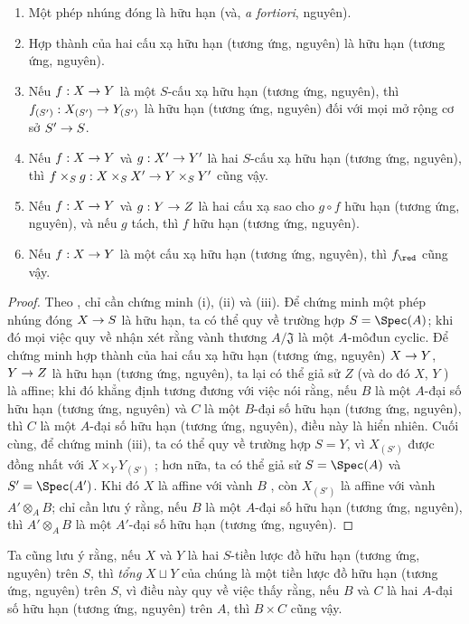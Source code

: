 \documentclass[oneside,10pt]{amsart}
\makeatletter
\newcommand{\ega@arrow}[2]{\mathchoice{#1}{#2}{#2}{#2}}
\renewcommand{\to}{\ega@arrow{\longrightarrow}{\rightarrow}}
\newcommand{\oldpage}[2][]{\marginnote{\normalfont\footnotesize\textbf{#1}~|~#2}\ignorespaces}
\let\EGAOriginalLabel\label
\renewcommand{\label}[1]{\phantomsection\EGAOriginalLabel{#1}}
\makeatother
\begin{document}
\begin{proposition}[6.1.5]
\label{II.6.1.5}
\medskip\noindent
\begin{enumerate}
  \item[\rm{(i)}] Một phép nhúng đóng là hữu hạn (và, \emph{a fortiori}, nguyên).
  \item[\rm{(ii)}] Hợp thành của hai cấu xạ hữu hạn (tương ứng, nguyên) là hữu hạn (tương ứng, nguyên).
  \item[\rm{(iii)}] Nếu $f:X\to Y$ là một $S$-cấu xạ hữu hạn (tương ứng, nguyên), thì $f_{(S')}:X_{(S')}\to Y_{(S')}$ là hữu hạn (tương ứng, nguyên) đối với mọi mở rộng cơ sở $S'\to S$.
  \item[\rm{(iv)}] Nếu $f:X\to Y$ và $g:X'\to Y'$ là hai $S$-cấu xạ hữu hạn (tương ứng, nguyên), thì $f\times_S g:X\times_S X'\to Y\times_S Y'$ cũng vậy.
  \item[\rm{(v)}] Nếu $f:X\to Y$ và $g:Y\to Z$ là hai cấu xạ sao cho $g\circ f$ hữu hạn (tương ứng, nguyên), và nếu $g$ tách, thì $f$ hữu hạn (tương ứng, nguyên).
  \item[\rm{(vi)}] Nếu $f:X\to Y$ là một cấu xạ hữu hạn (tương ứng, nguyên), thì $f_\red$ cũng vậy.
\end{enumerate}
\end{proposition}
\oldpage[II]{112}
\begin{proof}
Theo , chỉ cần chứng minh (i), (ii) và (iii).
Để chứng minh một phép nhúng đóng $X\to S$ là hữu hạn, ta có thể quy về trường hợp $S=\Spec(A)$; khi đó mọi việc quy về nhận xét rằng vành thương $A/\mathfrak{J}$ là một $A$-môđun cyclic.
Để chứng minh hợp thành của hai cấu xạ hữu hạn (tương ứng, nguyên) $X\to Y$, $Y\to Z$ là hữu hạn (tương ứng, nguyên), ta lại có thể giả sử $Z$ (và do đó $X$, $Y$ ) là affine; khi đó khẳng định tương đương với việc nói rằng, nếu $B$ là một $A$-đại số hữu hạn (tương ứng, nguyên) và $C$ là một $B$-đại số hữu hạn (tương ứng, nguyên), thì $C$ là một $A$-đại số hữu hạn (tương ứng, nguyên), điều này là hiển nhiên.
Cuối cùng, để chứng minh (iii), ta có thể quy về trường hợp $S=Y$, vì $X_{(S')}$ được đồng nhất với $X\times_Y Y_{(S')}$ ;
hơn nữa, ta có thể giả sử $S=\Spec(A)$ và $S'=\Spec(A')$.
Khi đó $X$ là affine với vành $B$ , còn $X_{(S')}$ là affine với vành $A'\otimes_A B$;
chỉ cần lưu ý rằng, nếu $B$ là một $A$-đại số hữu hạn (tương ứng, nguyên), thì $A'\otimes_A B$ là một $A'$-đại số hữu hạn (tương ứng, nguyên).
\end{proof}

Ta cũng lưu ý rằng, nếu $X$ và $Y$ là hai $S$-tiền lược đồ hữu hạn (tương ứng, nguyên) trên $S$, thì \emph{tổng} $X\sqcup Y$ của chúng là một tiền lược đồ hữu hạn (tương ứng, nguyên) trên $S$, vì điều này quy về việc thấy rằng, nếu $B$ và $C$ là hai $A$-đại số hữu hạn (tương ứng, nguyên) trên $A$, thì $B\times C$ cũng vậy.
\end{document}
